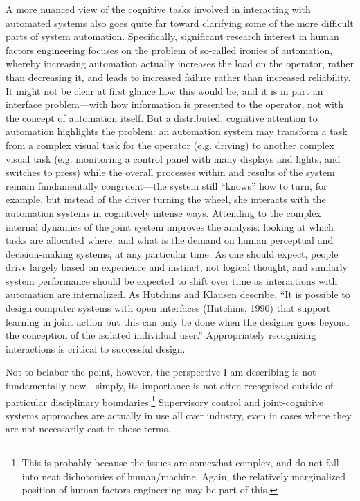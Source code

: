 A more nuanced view of the cognitive tasks involved in interacting
with automated systems also goes quite far toward clarifying some
of the more difficult parts of system automation. Specifically,
significant research interest in human factors engineering focuses on
the problem of so-called ironies of automation, whereby increasing automation actually
increases the load on the operator, rather than decreasing it, and
leads to increased failure rather than increased
reliability.\cite{???-somethingin-hutchins} It might
not be clear at first glance how this would be, and it is in part an
interface problem---with how information is presented to the operator,
not with the concept of automation itself. But a distributed,
cognitive attention to automation highlights the problem:  an
automation system may transform a task from a complex visual task for the
operator (e.g. driving) to another complex visual task (e.g. monitoring a control
panel with many displays and lights, and switches to press) while the
overall processes within and results of the system remain
fundamentally congruent---the system still ``knows'' how to turn, for
example, but instead of the driver turning the wheel, she interacts
with the automation systems in cognitively intense ways. Attending to
the complex internal dynamics of
the joint system improves the analysis: looking at which tasks are
allocated where, and what is the demand on human perceptual and
decision-making systems, at any particular time. As one should expect,
people drive largely based on experience and instinct,\cite{article-http://www.telegraph.co.uk/news/science/science-news/11410261/Driverless-car-beats-racing-driver-for-first-time.html} not logical
thought, and similarly system performance should be expected to shift
over time as interactions with automation are internalized. As
Hutchins and Klausen describe, ``It is possible to design computer systems with open
interfaces (Hutchins, 1990) that support learning in joint action but
this can only be done when the designer goes beyond the conception of
the isolated individual user.''\cite[p. 13]{hutchinsKlausen}
Appropriately recognizing interactions is critical to successful design.

Not to belabor the point, however, the perspective I am describing is
not fundamentally new---simply, its importance is not often
recognized outside of particular disciplinary
boundaries.\footnote{This is probably because the issues are
  somewhat complex, and do not fall into neat dichotomies of
  human/machine. Again, the relatively marginalized position of
  human-factors engineering may be part of this.} Supervisory control and 
joint-cognitive systems approaches are actually in use all over
industry, even in cases where they are not necessarily cast in
those terms. 

